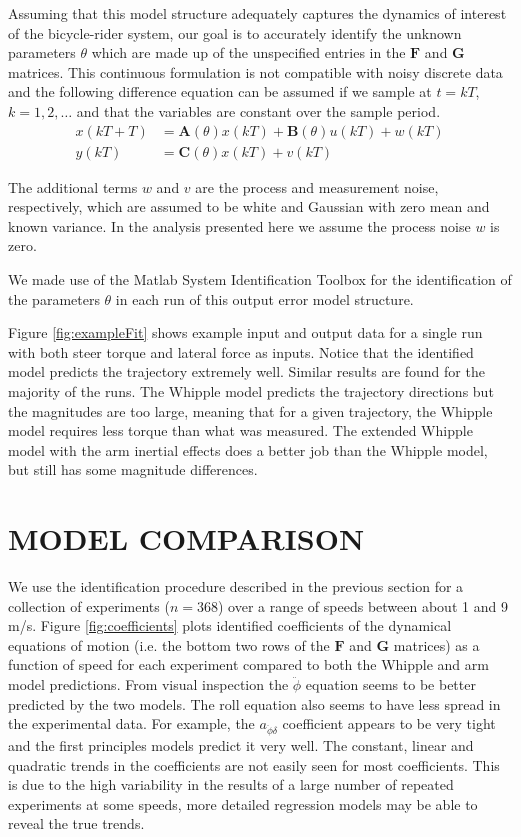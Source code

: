 \documentclass[twocolumn,10pt]{asme2e}
\begin{document}
Assuming that this model structure adequately captures the dynamics of
interest of the bicycle-rider system, our goal is to accurately identify the
unknown parameters $\theta$ which are made up of the unspecified entries in the
$\mathbf{F}$ and $\mathbf{G}$ matrices. This continuous formulation is not
compatible with noisy discrete data and the following difference equation can
be assumed if we sample at $t=kT$, $k=1,2,\dots$ and that the variables are
constant over the sample period.
\begin{equation}
	\begin{split}
		x(kT + T) & = \mathbf{A}(\theta)x(kT) + \mathbf{B}(\theta)u(kT) + w(kT)\\
		y(kT) & = \mathbf{C}(\theta)x(kT) + v(kT)
	\end{split}
\end{equation}

The additional terms $w$ and $v$ are the process and measurement noise,
respectively, which are assumed to be white and Gaussian with zero mean and
known variance. In the analysis presented here we assume the process noise $w$
is zero.

We made use of the Matlab System Identification Toolbox for the identification
of the parameters $\theta$ in each run of this output error model structure.

Figure \ref{fig:exampleFit} shows example input and output data for a
single run with both steer torque and lateral force as inputs. Notice that the
identified model predicts the trajectory extremely well. Similar results are
found for the majority of the runs. The Whipple model predicts the trajectory
directions but the magnitudes are too large, meaning that for a given
trajectory, the Whipple model requires less torque than what was measured. The
extended Whipple model with the arm inertial effects does a better job than the
Whipple model, but still has some magnitude differences.
%
\section*{MODEL COMPARISON}
We use the identification procedure described in the previous section for a
collection of experiments ($n=368$) over a range of speeds between about 1 and
9 m/s.  Figure \ref{fig:coefficients} plots identified coefficients of the
dynamical equations of motion (i.e. the bottom two rows of the \(\mathbf{F}\)
and \(\mathbf{G}\) matrices) as a function of speed for each experiment
compared to both the Whipple and arm model predictions. From visual inspection
the $\ddot{\phi}$ equation seems to be better predicted by the two models. The
roll equation also seems to have less spread in the experimental data. For
example, the \(a_{\ddot{\phi}\delta}\) coefficient appears to be very tight and
the first principles models predict it very well. The constant, linear and
quadratic trends in the coefficients are not easily seen for most coefficients.
This is due to the high variability in the results of a large number of
repeated experiments at some speeds, more detailed regression models may be
able to reveal the true trends.
\end{document}

